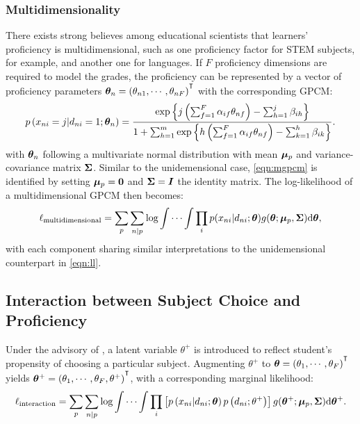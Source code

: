 \subsubsection{Multidimensionality}

There exists strong believes among educational scientists that learners' proficiency is multidimensional, such as one proficiency factor for STEM subjects, for example, and another one for languages. If $F$ proficiency dimensions are required to model the grades, the proficiency can be represented by a vector of proficiency parameters $\m{\theta}_n=\left(\theta_{n1}, \cdots, \theta_{nF}\right)\Ts$ with the corresponding GPCM:
\begin{equation}\label{eqn:mgpcm}
    p \left( x_{ni} = j | d_{ni} = 1; \boldsymbol{\theta}_n \right) =
    \frac{ \mathrm{exp}\left\{ j \left( \sum_{f=1}^F \alpha_{if} \theta_{nf} \right) - \sum_{h=1}^j \beta_{ih} \right\} }{ 1 + \sum_{h=1}^m \mathrm{exp}\left\{ h \left( \sum_{f=1}^F \alpha_{if} \theta_{nf} \right) - \sum_{k=1}^h \beta_{ik} \right\} }.
\end{equation}
with $\boldsymbol{\theta}_n$ following a multivariate normal distribution with mean $\boldsymbol{\mu}_p$ and variance-covariance matrix $\boldsymbol{\Sigma}$. Similar to the unidemensional case, \cref{eqn:mgpcm} is identified by setting $\boldsymbol{\mu}_p=\boldsymbol{0}$ and $\boldsymbol{\Sigma} = \boldsymbol{I}$ the identity matrix. The log-likelihood of a multidimensional GPCM then becomes:
\begin{equation}\label{eqn:mll}
    \ell_\text{multidimensional} = \sum_{p} \sum_{n | p} \log \int \cdots \int \prod_i p( x_{ni} | d_{ni}; \boldsymbol{\theta} ) g( \boldsymbol{\theta}; \boldsymbol{\mu}_p, \boldsymbol{\Sigma} ) \mathrm{d} \boldsymbol{\theta},
\end{equation}
with each component sharing similar interpretations to the unidemensional counterpart in \cref{eqn:ll}.

\subsection{Interaction between Subject Choice and Proficiency}

Under the advisory of \textcite{korobko:2008}, a latent variable $\theta^+$ is introduced to reflect student's propensity of choosing a particular subject. Augmenting $\theta^+$ to $\m{\theta}=\left(\theta_1, \cdots, \theta_F\right)\Ts$ yields $\m{\theta}^+=\left(\theta_1, \cdots, \theta_F, \theta^+\right)\Ts$, with a corresponding marginal likelihood:
\begin{equation}\label{eqn:lli}
    \ell_\text{interaction} = \sum_p \sum_{ n | p} \log \int \cdots \int \prod_i \left[ p \left( x_{ni} | d_{ni}; \boldsymbol{\theta} \right) p \left( d_{ni}; \theta^+ \right) \right] g(\boldsymbol{\theta}^+; \boldsymbol{\mu}_p, \boldsymbol{\Sigma}) \mathrm{d} \boldsymbol{\theta}^+ .
\end{equation}